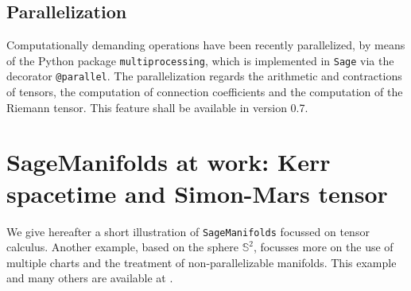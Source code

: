 \documentclass[a4paper]{jpconf}
\newcommand{\soft}[1]{\texttt{#1}}
\newcommand{\code}[1]{\texttt{#1}}
\newcommand{\Sage}{\soft{Sage}}
\newcommand{\SM}{\soft{SageManifolds}}
\begin{document}
\subsection{Parallelization}

Computationally demanding operations have been recently parallelized, 
by means of the Python package \code{multiprocessing}, which is
implemented in \Sage{} via the decorator \code{@parallel}. 
The parallelization regards the arithmetic and contractions 
of tensors, the computation of connection coefficients and the computation
of the Riemann tensor. 
This feature shall be available in version 0.7. 



\section{SageManifolds at work: Kerr spacetime and Simon-Mars tensor}

We give hereafter a short illustration of \SM{} focussed on tensor 
calculus. Another example, based on the sphere $\mathbb{S}^2$, 
focusses more on the use of multiple charts and the treatment of non-parallelizable 
manifolds. This example and many others are available at
\cite{SM_examples}.
\end{document}
